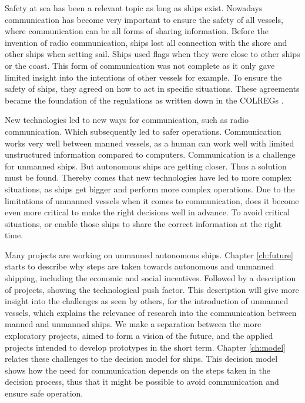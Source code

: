 Safety at sea has been a relevant topic as long as ships exist. Nowadays communication has become very important to ensure the safety of all vessels, where communication can be all forms of sharing information. Before the invention of radio communication, ships lost all connection with the shore and other ships when setting sail. Ships used flags when they were close to other ships or the coast. This form of communication was not complete as it only gave limited insight into the intentions of other vessels for example. To ensure the safety of ships, they agreed on how to act in specific situations. These agreements became the foundation of the regulations as written down in the \acf{COLREGs} \cite{IMO1972}.

New technologies led to new ways for communication, such as radio communication. Which subsequently led to safer operations. Communication works very well between manned vessels, as a human can work well with limited unstructured information compared to computers. Communication is a challenge for unmanned ships. But autonomous ships are getting closer. Thus a solution must be found. Thereby comes that new technologies have led to more complex situations, as ships get bigger and perform more complex operations. Due to the limitations of unmanned vessels when it comes to communication, does it become even more critical to make the right decisions well in advance. To avoid critical situations, or enable those ships to share the correct information at the right time.

Many projects are working on unmanned autonomous ships. Chapter \ref{ch:future} starts to describe why steps are taken towards autonomous and unmanned shipping, including the economic and social incentives. Followed by a description of projects, showing the technological push factor. This description will give more insight into the challenges as seen by others, for the introduction of unmanned vessels, which explains the relevance of research into the communication between manned and unmanned ships. We make a separation between the more exploratory projects, aimed to form a vision of the future, and the applied projects intended to develop prototypes in the short term.
Chapter \ref{ch:model} relates these challenges to the decision model for ships. This decision model shows how the need for communication depends on the steps taken in the decision process, thus that it might be possible to avoid communication and ensure safe operation.